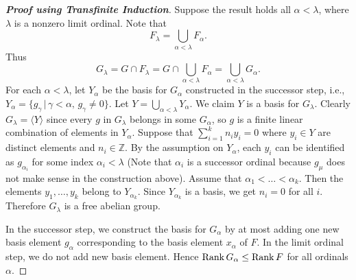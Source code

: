 \begin{proof}[\textbf{Proof using Transfinite Induction}]
  Suppose the result holds all $\alpha < \lambda$, where $\lambda$ is a nonzero limit ordinal. 
Note that 
$$F_\lambda = \bigcup_{\alpha < \lambda} F_\alpha.$$ 
Thus 
$$G_\lambda = G \cap F_\lambda = G \cap\bigcup_{\alpha < \lambda} F_\alpha = \bigcup_{\alpha < \lambda} G_\alpha.$$
For each $\alpha < \lambda$, let $Y_\alpha$ be the basis for $G_\alpha$ constructed in the successor step, i.e., $Y_{\alpha} = \{g_{\gamma}\,|\, \gamma<\alpha, \, g_{\gamma}\neq 0\}$. Let $Y = \bigcup_{\alpha < \lambda} Y_\alpha$. We claim $Y$ is a basis for $G_\lambda$. Clearly $G_{\lambda} = \langle Y\rangle$ since every $g$ in $G_{\lambda}$ belongs in some $G_\alpha$, so $g$ is a finite linear combination of elements in $Y_{\alpha}$. Suppose that $\sum_{i=1}^k n_i y_i = 0$ where $y_i \in Y$ are distinct elements and $n_i\in\mathbb{Z}$. By the assumption on $Y_{\alpha}$, each $y_i$ can be identified as $g_{\alpha_i}$ for some index $\alpha_i < \lambda$ (Note that $\alpha_i$ is a successor ordinal because $g_{\mu}$ does not make sense in the construction above). Assume that $\alpha_1<\dots< \alpha_k$. Then the  elements $y_1, \dots, y_k$ belong to  $Y_{\alpha_k}$. Since $Y_{\alpha_k}$ is a basis, we get $n_i = 0$ for all $i$. Therefore $G_\lambda$ is a free abelian group.

In the successor step, we construct the basis for $G_{\alpha}$ by at most adding one new basis element $g_\alpha$ corresponding to the basis element $x_\alpha$ of $F$. In the limit ordinal step, we do not add new basis element. Hence $\operatorname{Rank} G_{\alpha} \leq\operatorname{Rank}  F$ for all ordinals $\alpha$.
\end{proof}

	
